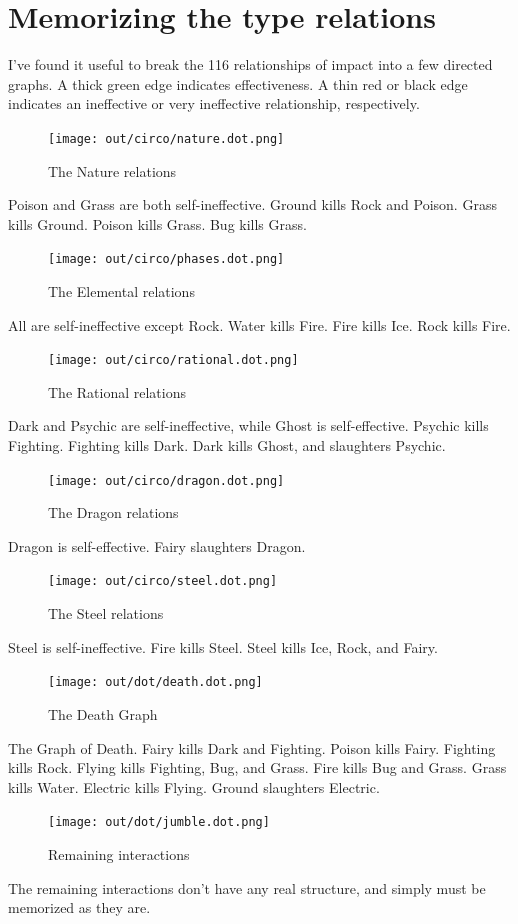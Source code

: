 \section{Memorizing the type relations}
I've found it useful to break the 116 relationships of impact into a few directed graphs.
A thick green edge indicates effectiveness.
A thin red or black edge indicates an ineffective or very ineffective relationship, respectively.

\begin{figure}[h]
\centering
\texttt{[image: out/circo/nature.dot.png]}
\caption{The Nature relations}
\end{figure}
Poison and Grass are both self-ineffective.
Ground kills Rock and Poison.
Grass kills Ground.
Poison kills Grass.
Bug kills Grass.

\begin{figure}[h]
\centering
\texttt{[image: out/circo/phases.dot.png]}
\caption{The Elemental relations}
\end{figure}
All are self-ineffective except Rock.
Water kills Fire.
Fire kills Ice.
Rock kills Fire.

\begin{figure}[h]
\centering
\texttt{[image: out/circo/rational.dot.png]}
\caption{The Rational relations}
\end{figure}
Dark and Psychic are self-ineffective, while Ghost is self-effective.
Psychic kills Fighting.
Fighting kills Dark.
Dark kills Ghost, and slaughters Psychic.

\begin{figure}
\centering
\texttt{[image: out/circo/dragon.dot.png]}
\caption{The Dragon relations}
\end{figure}
Dragon is self-effective.
Fairy slaughters Dragon.

\begin{figure}
\centering
\texttt{[image: out/circo/steel.dot.png]}
\caption{The Steel relations}
\end{figure}
Steel is self-ineffective.
Fire kills Steel.
Steel kills Ice, Rock, and Fairy.

\begin{figure}[h]
\centering
\texttt{[image: out/dot/death.dot.png]}
\caption{The Death Graph}
\end{figure}
The Graph of Death.
Fairy kills Dark and Fighting.
Poison kills Fairy.
Fighting kills Rock.
Flying kills Fighting, Bug, and Grass.
Fire kills Bug and Grass.
Grass kills Water.
Electric kills Flying.
Ground slaughters Electric.

\begin{figure}[h]
\centering
\texttt{[image: out/dot/jumble.dot.png]}
\caption{Remaining interactions}
\end{figure}
The remaining interactions don't have any real structure, and simply must be
memorized as they are.

